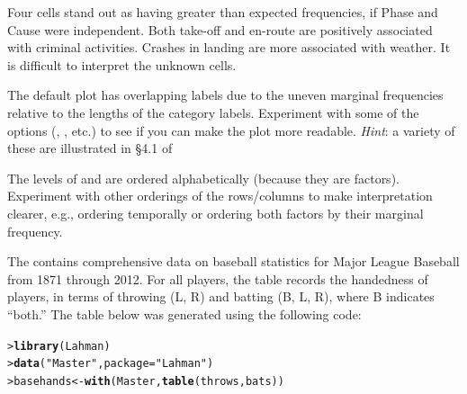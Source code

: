 \documentclass[10pt]{report}\usepackage[]{graphicx}\usepackage[]{color}
\makeatletter
\newcommand{\hlstr}[1]{\textcolor[rgb]{0.192,0.494,0.8}{#1}}%
\newcommand{\hlstd}[1]{\textcolor[rgb]{0.345,0.345,0.345}{#1}}%
\newcommand{\hlkwb}[1]{\textcolor[rgb]{0.69,0.353,0.396}{#1}}%
\newcommand{\hlkwc}[1]{\textcolor[rgb]{0.333,0.667,0.333}{#1}}%
\newcommand{\hlkwd}[1]{\textcolor[rgb]{0.737,0.353,0.396}{\textbf{#1}}}%
\newenvironment{kframe}{%
 \def\at@end@of@kframe{}%
 \ifinner\ifhmode%
  \def\at@end@of@kframe{\end{minipage}}%
  \begin{minipage}{\columnwidth}%
 \fi\fi%
 \def\FrameCommand##1{\hskip\@totalleftmargin \hskip-\fboxsep
 \colorbox{shadecolor}{##1}\hskip-\fboxsep
     \hskip-\linewidth \hskip-\@totalleftmargin \hskip\columnwidth}%
 \MakeFramed {\advance\hsize-\width
   \@totalleftmargin\z@ \linewidth\hsize
   \@setminipage}}%
 {\par\unskip\endMakeFramed%
 \at@end@of@kframe}
\newenvironment{knitrout}{}{} %
\renewenvironment{knitrout}{\small\renewcommand{\baselinestretch}{.85}}{} %
\makeatother
\begin{document}
\begin{Exercises}
\begin{enumerate*}
\begin{ans}
\begin{knitrout}
\end{knitrout}
    Four cells stand out as having greater than expected frequencies, if Phase and Cause were independent. 
    Both take-off and en-route are positively associated with criminal activities.
    Crashes in landing are more associated with weather.  It is difficult to interpret the unknown cells.
    \end{ans}
    
    
    \item The default plot has overlapping labels due to the uneven marginal frequencies relative to the lengths of the category
    labels.  Experiment with some of the  options (, , etc.)
    to see if you can make the plot more readable. \emph{Hint}: a variety of these are illustrated in \S 4.1 of 
    \begin{ans}
    \end{ans}
    
    \item The levels of  and  are ordered alphabetically (because they are factors).  Experiment with 
    other orderings of the rows/columns to make interpretation clearer, e.g., ordering  temporally or ordering
    both factors by their marginal frequency.
    \begin{ans}
    \end{ans}
    
  \end{enumerate*}

\exercise The  contains comprehensive data on baseball statistics for Major League Baseball from 1871 through 2012.  
For all players, the  table records the handedness of players, in terms of
throwing (L, R) and batting (B, L, R), where B indicates ``both.''
The table below was generated using the following code:
\begin{knitrout}\footnotesize
{}\color{fgcolor}\begin{kframe}
\begin{alltt}
\hlstd{> }\hlkwd{library}\hlstd{(Lahman)}
\hlstd{> }\hlkwd{data}\hlstd{(}\hlstr{"Master"}\hlstd{,} \hlkwc{package} \hlstd{=} \hlstr{"Lahman"}\hlstd{)}
\hlstd{> }\hlstd{basehands} \hlkwb{<-} \hlkwd{with}\hlstd{(Master,} \hlkwd{table}\hlstd{(throws, bats))}
\end{alltt}
\end{kframe}
\end{knitrout}



\end{Exercises}
\end{document}
